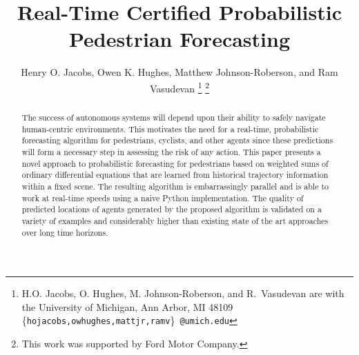 \documentclass[letterpaper,10pt,conference]{ieeeconf}
\begin{document}
\title{Real-Time Certified Probabilistic Pedestrian Forecasting}

\author{Henry O. Jacobs, Owen K. Hughes, Matthew Johnson-Roberson, and Ram Vasudevan
 \thanks{ H.O. Jacobs, O. Hughes, M. Johnson-Roberson, and R.~Vasudevan are with the University of Michigan, Ann Arbor, MI 48109
{\scriptsize \{\texttt{hojacobs,owhughes,mattjr,ramv}\}~\texttt{@umich.edu}}}
\thanks{This work was supported by Ford Motor Company.}
}



\maketitle

\begin{abstract}
The success of autonomous systems will depend upon their ability to safely navigate human-centric environments.
This motivates the need for a real-time, probabilistic forecasting algorithm for pedestrians, cyclists, and other agents since these predictions will form a necessary step in assessing the risk of any action.
This paper presents a novel approach to probabilistic forecasting for pedestrians based on weighted sums of ordinary differential equations that are learned from historical trajectory information within a fixed scene.
The resulting algorithm is embarrassingly parallel and is able to work at real-time speeds using a naive Python implementation.
The quality of predicted locations of agents generated by the proposed algorithm is validated on a variety of examples and considerably higher than existing state of the art approaches over long time horizons.
\end{abstract}
\end{document}

